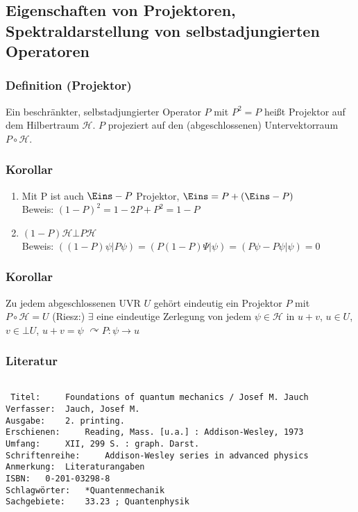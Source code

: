 \documentclass[twoside,a4paper]{scrartcl}
\renewcommand{\1}{\mathds{1}}
\newcommand{\ra}{\rightarrow}
\begin{document}
\subsection{Eigenschaften von Projektoren, Spektraldarstellung von selbstadjungierten Operatoren}
\subsubsection*{Definition (Projektor)}
Ein beschränkter, selbstadjungierter Operator $P$ mit $P^2=P$ heißt Projektor auf dem Hilbertraum $\mathcal H$. $P$ projeziert auf den (abgeschlossenen) Untervektorraum $P \circ  \mathcal H$.
\subsubsection*{Korollar}
\begin{enumerate}
 \item Mit P ist auch $\Eins-P$ Projektor, $\Eins=P+(\Eins-P)$\\
Beweis: $(1-P)^2=1-2P+P^2=1-P$
 \item $(1-P) \mathcal H \bot P \mathcal H$\\
Beweis: $((1-P)\psi|P\psi)=(P(1-P)\Psi|\psi)=(P\psi-P\psi|\psi)=0$
\end{enumerate}
\subsubsection*{Korollar}
Zu jedem abgeschlossenen UVR $U$ gehört eindeutig ein Projektor $P$ mit $P \circ \mathcal H=U$
(Riesz:) $\exists$ eine eindeutige Zerlegung von jedem $\psi \in \mathcal H$ in $u+v$, $u \in U$, $v \in \bot U$, $u+v=\psi$
$\curvearrowright P: \psi \ra u$ 
\subsubsection*{Literatur}
\begin{tiny}
\begin{verbatim}

 Titel: 	Foundations of quantum mechanics / Josef M. Jauch
Verfasser: 	Jauch, Josef M.
Ausgabe: 	2. printing.
Erschienen: 	Reading, Mass. [u.a.] : Addison-Wesley, 1973
Umfang: 	XII, 299 S. : graph. Darst.
Schriftenreihe: 	Addison-Wesley series in advanced physics
Anmerkung: 	Literaturangaben
ISBN: 	0-201-03298-8
Schlagwörter: 	*Quantenmechanik
Sachgebiete: 	33.23 ; Quantenphysik
\end{verbatim}
\end{tiny}
\end{document}
